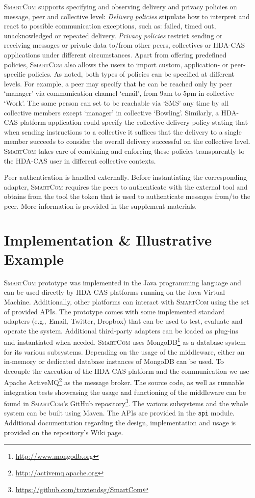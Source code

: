 \documentclass{llncs}
\newcommand{\mdl}{\textsc{SmartCom}}
\begin{document}
    \mdl{} supports specifying and observing delivery and privacy policies on message, peer and collective level: 
	\emph{Delivery policies} stipulate how to interpret and react to possible communication exceptions, such as: failed, timed out, unacknowledged or repeated  delivery. \emph{Privacy policies} restrict sending or receiving messages or private data to/from other peers, collectives or HDA-CAS applications under different circumstances. 
	Apart from offering predefined policies, \mdl{} also allows the users to import custom, application- or peer-specific policies. 
	As noted, both types of policies can be specified at different levels. For example, a peer may specify that he can be reached only by peer `manager' via communication channel `email', from 9am to 5pm in collective `Work'. The same person can set to be reachable via `SMS' any time by all collective members except `manager' in collective `Bowling'.
	Similarly, a HDA-CAS platform application could specify the collective delivery policy stating that when sending instructions to a collective it suffices that the delivery to a single member succeeds to consider the overall delivery successful on the collective level. \mdl{} takes care of combining and enforcing these policies transparently to the HDA-CAS user in different collective contexts.

 	Peer authentication is handled externally. Before instantiating the corresponding adapter, \mdl{} requires the peers to authenticate with the external tool and obtains from the tool the token that is used to authenticate messages from/to the peer. More information is provided in the supplement materials.
      
\section{Implementation \& Illustrative Example}
\label{sec:impl}

	\mdl{} prototype was implemented in the Java programming language and can be used directly by HDA-CAS platforms running on the Java Virtual Machine. Additionally, other platforms can interact with \mdl{} using the set of provided APIs. 
	The prototype comes with some implemented standard adapters (e.g., Email, Twitter, Dropbox) that can be used to test, evaluate and operate the system.
	Additional third-party adapters can be loaded as plug-ins and instantiated when needed.
	\mdl{} uses MongoDB\footnote{\url{http://www.mongodb.org}} as a database system for its various subsystems. Depending on the usage of the middleware, either an in-memory or dedicated database instances of MongoDB can be used. To decouple the execution of the HDA-CAS platform and the communication we use Apache ActiveMQ\footnote{\url{http://activemq.apache.org}} as the message broker.
	The source code, as well as runnable integration tests showcasing the usage and functioning of the middleware can be found in \mdl's GitHub repository\footnote{\url{https://github.com/tuwiendsg/SmartCom}}. The various subsystems and the whole system can be built using Maven. The APIs are provided in the \texttt{api} module. Additional documentation regarding the design, implementation and usage is provided on the repository's Wiki page. 
\end{document}
